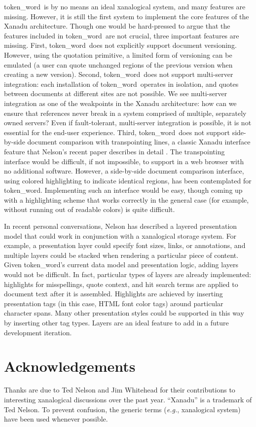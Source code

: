 \documentclass{acm_proc_article-sp}
\newcommand{\tokenWord}{token\_word}
\begin{document}
\tokenWord \  is by no means an ideal xanalogical system, and many features are missing.
However, it is still the first system to implement the core features of the Xanadu architecture.
Though one would be hard-pressed to argue that the features included in \tokenWord \  are not crucial, three important features are missing.
First, \tokenWord \  does not explicitly support document versioning.
However, using the quotation primitive, a limited form of versioning can be emulated (a user can quote unchanged regions of the previous version when creating a new version).
Second, \tokenWord \  does not support multi-server integration:  each installation of \tokenWord \  operates in isolation, and quotes between documents at different sites are not possible.
We see multi-server integration as one of the weakpoints in the Xanadu architecture:  how can we ensure that references never break in a system comprised of multiple, separately owned servers?
Even if fault-tolerant, multi-server integration is possible, it is not essential for the end-user experience. 
Third, \tokenWord \   does not support side-by-side document comparison with transpointing lines, a classic Xanadu interface feature that Nelson's recent paper describes in detail \cite{Nelson1999}.
The transpointing interface would be difficult, if not impossible, to support in a web browser with no additional software.
However, a side-by-side document comparison interface, using colored highlighting to indicate identical regions, has been contemplated for \tokenWord.
Implementing such an interface would be easy, though coming up with a highlighting scheme that works correctly in the general case (for example, without running out of readable colors) is quite difficult.

In recent personal conversations, Nelson has described a layered presentation model that could work in conjunction with a xanalogical storage system.
For example, a presentation layer could specify font sizes, links, or annotations, and multiple layers could be stacked when rendering a particular piece of content.
Given \tokenWord's current data model and presentation logic, adding layers would not be difficult.
In fact, particular types of layers are already implemented:  highlights for misspellings, quote context, and hit search terms are applied to document text after it is assembled.
Highlights are achieved by inserting presentation tags (in this case, HTML font color tags) around particular character spans.
Many other presentation styles could be supported in this way by inserting other tag types.
Layers are an ideal feature to add in a future development iteration.

\section{Acknowledgements}
Thanks are due to Ted Nelson and Jim Whitehead for their contributions to interesting xanalogical discussions over the past year. ``Xanadu'' is a trademark of Ted Nelson.  To prevent confusion, the generic terms (\textit{e.g.}, xanalogical system) have been used whenever possible.



\end{document}
